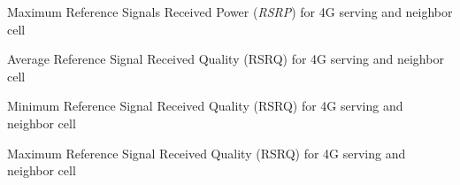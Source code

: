 %
{Maximum Reference Signals Received Power (\textit{RSRP}) for 4G serving and neighbor cell}


%
{Average Reference Signal Received Quality (RSRQ) for 4G serving and neighbor cell}

%
{Minimum Reference Signal Received Quality (RSRQ) for 4G serving and neighbor cell}

%
{Maximum Reference Signal Received Quality (RSRQ) for 4G serving and neighbor cell}

